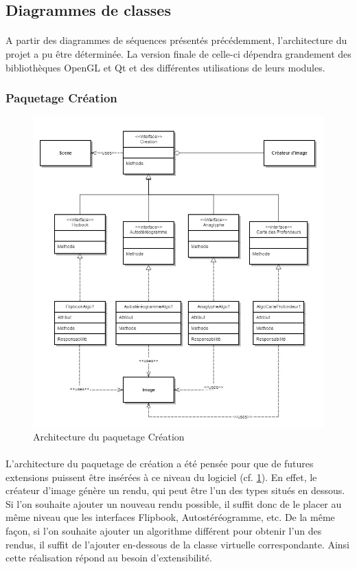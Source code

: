 \newpage

\subsection{Diagrammes de classes}

\paragraph{}
A partir des diagrammes de séquences présentés précédemment, l’architecture du projet a pu être déterminée. La version finale de celle-ci dépendra grandement des bibliothèques OpenGL et Qt et des différentes utilisations de leurs modules.

\subsubsection{Paquetage Création}

\begin{figure}[h]
		\centering
		\includegraphics[scale=0.4]{package_creation.jpg}
		\caption{\label{fig:paqCreation} Architecture du paquetage Création}
\end{figure}

\paragraph{}
L’architecture du paquetage de création a été pensée pour que de futures extensions puissent être insérées à ce niveau du logiciel (cf. \ref{fig:paqCreation}). En effet, le créateur d’image génère un rendu, qui peut être l’un des types situés en dessous. Si l’on souhaite ajouter un nouveau rendu possible, il suffit donc de le placer au même niveau que les interfaces Flipbook, Autostéréogramme, etc. De la même façon, si l’on souhaite ajouter un algorithme différent pour obtenir l’un des rendus, il suffit de l’ajouter en-dessous de la classe virtuelle correspondante. Ainsi cette réalisation répond au besoin d’extensibilité.

